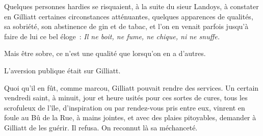 \documentclass[french,twoside]{book} %
\begin{document}
Quelques personnes hardies se risquaient, à la suite du sieur Landoys, à constater en Gilliatt certaines circonstances atténuantes, quelques apparences de qualités, sa sobriété, son abstinence de gin et de tabac, et l’on en venait parfois jusqu’à faire de lui ce bel éloge : \emph{Il ne boit, ne fume, ne chique, ni ne snuffe.}\par
Mais être sobre, ce n’est une qualité que lorsqu’on en a d’autres.\par
L’aversion publique était sur Gilliatt.\par
Quoi qu’il en fût, comme marcou, Gilliatt pouvait rendre des services. Un certain vendredi saint, à minuit, jour et heure usités pour ces sortes de cures, tous les scrofuleux de l’île, d’inspiration ou par rendez-vous pris entre eux, vinrent en foule au Bû de la Rue, à mains jointes, et avec des plaies pitoyables, demander à Gilliatt de les guérir. Il refusa. On reconnut là sa méchanceté.
\end{document}
